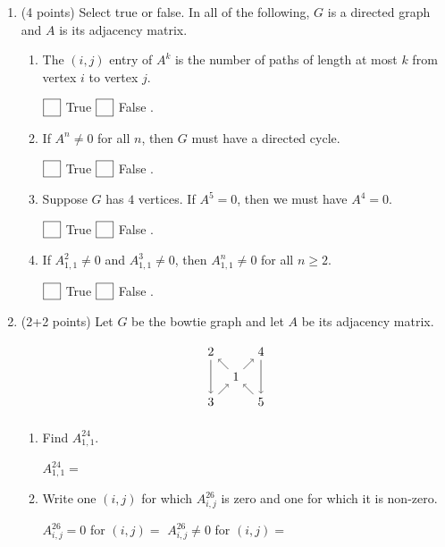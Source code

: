 \documentclass{amsart}
\begin{document}
\begin{enumerate}
\item (4 points) Select true or false.
In all of the following, \(G\) is a directed graph and \(A\) is its adjacency matrix.

\begin{enumerate}
\item The \((i,j)\) entry of \(A^k\) is the number of paths of length at most \(k\) from vertex \(i\) to vertex \(j\).

\hfill \(\fbox{\phantom X}\) True \hfill \(\fbox{\phantom X}\) False \hfill.

\item If \(A^n \neq 0\) for all \(n\), then \(G\) must have a directed cycle.

\hfill \(\fbox{\phantom X}\) True \hfill \(\fbox{\phantom X}\) False \hfill.

\item Suppose \(G\) has \(4\) vertices.
If \(A^5 = 0\), then we must have \(A^4 = 0\).

\hfill \(\fbox{\phantom X}\) True \hfill \(\fbox{\phantom X}\) False \hfill.

\item If \(A^2_{1,1} \neq 0\) and \(A^3_{1,1} \neq 0\), then \(A^n_{1,1} \neq 0\) for all \(n \geq 2\).

\hfill \(\fbox{\phantom X}\) True \hfill \(\fbox{\phantom X}\) False \hfill.
\end{enumerate}

\item (2+2 points)
Let \(G\) be the bowtie graph and let \(A\) be its adjacency matrix.

\[\begin{tikzpicture}
     \node (1) {1};
     \node[above left of=1](2){2};
     \node[below left of=1](3){3};
     \node[above right of=1](4) {4};
     \node[below right of=1](5) {5};
     \draw[->]
     (1) edge (2)
     (2) edge (3)
     (3) edge (1)
     (1) edge (4)
     (4) edge (5)
     (5) edge (1);
     \end{tikzpicture}
     \]

\begin{enumerate}
\item Find \(A^{24}_{1,1}\).
\begin{workbox}
\(A^{24}_{1,1} =\) 
\end{workbox}

\item Write one \((i,j)\) for which \(A^{26}_{i,j}\) is zero and one for which it is non-zero.
\begin{workbox}
\(A^{26}_{i,j} = 0\) for \((i,j) =\)
\hfill
\(A^{26}_{i,j} \neq 0\) for \((i,j) =\)
\hfill
\hspace{3cm}
\end{workbox}
\end{enumerate}


\end{enumerate}
\end{document}

